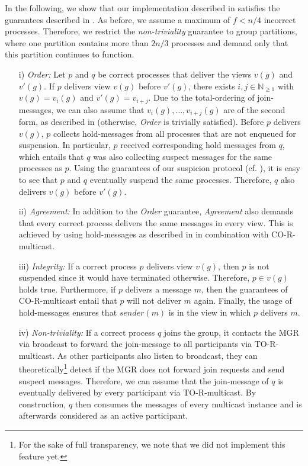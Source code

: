 \documentclass[runningheads]{llncs}
\begin{document}
In the following, we show that our implementation described in  satisfies the guarantees described in \cite[p.~772-773]{ds_book}. As before, we assume a maximum of $f < n/4$ incorrect processes. Therefore, we restrict the \textit{non-triviality} guarantee to group partitions, where one partition contains more than $2n/3$ processes and demand only that this partition continues to function.
\begin{enumerate}
    \item[i)] \textit{Order:} Let $p$ and $q$ be correct processes that deliver the views $v(g)$ and $v'(g)$. If $p$ delivers view $v(g)$ before $v'(g)$, there exists $i, j \in \mathbb{N}_{\geq 1}$ with $v(g) = v_i(g)$ and $v'(g) = v_{i+j}$. Due to the total-ordering of join-messages, we can also assume that $v_i(g), \ldots, v_{i+j}(g)$ are of the second form, as described in  (otherwise, \textit{Order} is trivially satisfied). Before $p$ delivers $v(g)$, $p$ collects hold-messages from all processes that are not enqueued for suspension. In particular, $p$ received corresponding hold messages from $q$, which entails that $q$ was also collecting suspect messages for the same processes as $p$. Using the guarantees of our suspicion protocol (cf. ), it is easy to see that $p$ and $q$ eventually suspend the same processes. Therefore, $q$ also delivers $v(g)$ before $v'(g)$.
    \item[ii)] \textit{Agreement:} In addition to the \textit{Order} guarantee, \textit{Agreement} also demands that every correct process delivers the same messages in every view. This is achieved by using hold-messages as described in  in combination with CO-R-multicast. 
    \item[iii)] \textit{Integrity:} If a correct process $p$ delivers view $v(g)$, then $p$ is not suspended since it would have terminated otherwise. Therefore, $p \in v(g)$ holds true. Furthermore, if $p$ delivers a message $m$, then the guarantees of CO-R-multicast entail that $p$ will not deliver $m$ again. Finally, the usage of hold-messages ensures that $sender(m)$ is in the view in which $p$ delivers $m$.
    \item[iv)] \textit{Non-triviality:} If a correct process $q$ joins the group, it contacts the MGR via broadcast to forward the join-message to all participants via TO-R-multicast. As other participants also listen to broadcast, they can theoretically\footnote{For the sake of full transparency, we note that we did not implement this feature yet.} detect if the MGR does not forward join requests and send suspect messages. Therefore, we can assume that the join-message of $q$ is eventually delivered by every participant via TO-R-multicast. By construction, $q$ then consumes the messages of every multicast instance and is afterwards considered as an active participant.
    

\end{enumerate}
\end{document}
